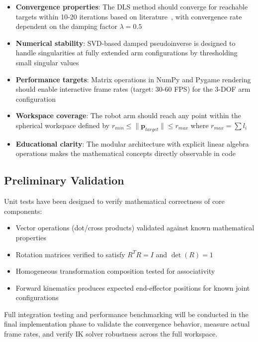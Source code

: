 \documentclass[11pt]{article}
\begin{document}
\begin{itemize}[nosep]
    \item \textbf{Convergence properties}: The DLS method should converge for reachable targets within 10-20 iterations based on literature~\cite{buss2004}, with convergence rate dependent on the damping factor $\lambda = 0.5$
    \item \textbf{Numerical stability}: SVD-based damped pseudoinverse is designed to handle singularities at fully extended arm configurations by thresholding small singular values
    \item \textbf{Performance targets}: Matrix operations in NumPy and Pygame rendering should enable interactive frame rates (target: 30-60 FPS) for the 3-DOF arm configuration
    \item \textbf{Workspace coverage}: The robot arm should reach any point within the spherical workspace defined by $r_{min} \leq \|\mathbf{p}_{target}\| \leq r_{max}$ where $r_{max} = \sum l_i$
    \item \textbf{Educational clarity}: The modular architecture with explicit linear algebra operations makes the mathematical concepts directly observable in code
\end{itemize}

\subsection{Preliminary Validation}

Unit tests have been designed to verify mathematical correctness of core components:

\begin{itemize}[nosep]
    \item Vector operations (dot/cross products) validated against known mathematical properties
    \item Rotation matrices verified to satisfy $R^T R = I$ and $\det(R) = 1$
    \item Homogeneous transformation composition tested for associativity
    \item Forward kinematics produces expected end-effector positions for known joint configurations
\end{itemize}

Full integration testing and performance benchmarking will be conducted in the final implementation phase to validate the convergence behavior, measure actual frame rates, and verify IK solver robustness across the full workspace.
\end{document}
